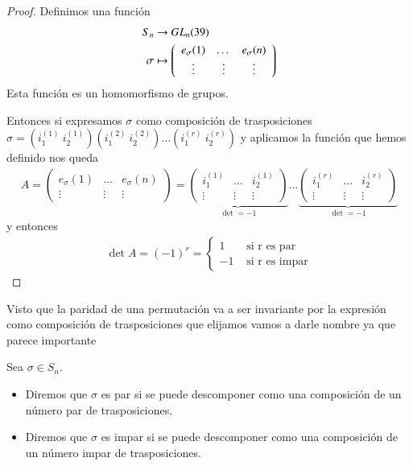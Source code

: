 \begin{proof}
	Definimos una función
	\begin{align*}
		S_n &\to GL_n(39)\\
		\sigma &\mapsto \left(\begin{array}{ccc}
		e_\sigma(1) & \dots & e_\sigma(n) \\
		\vdots & \vdots & \vdots
		\end{array}\right)
	\end{align*}
	Esta función es un homomorfismo de grupos.
	
	Entonces si expresamos $\sigma$ como composición de trasposiciones $\sigma = (i_1^{(1)}\ i_2^{(1)})(i_1^{(2)}\ i_2^{(2)}) \dots (i_1^{(r)}\ i_2^{(r)})$ y aplicamos la función que hemos definido nos queda
	\begin{align*}
		A = \left(\begin{array}{ccc}
		e_\sigma(1) & \dots & e_\sigma(n) \\
		\vdots & \vdots & \vdots
		\end{array}\right) = \underbrace{\left(\begin{array}{ccc}
			i_1^{(1)} & \dots & i_2^{(1)} \\
			\vdots & \vdots & \vdots
			\end{array}\right)}_{\det = -1} \dots \underbrace{\left(\begin{array}{ccc}
			i_1^{(r)} & \dots & i_2^{(r)} \\
			\vdots & \vdots & \vdots
			\end{array}\right)}_{\det = -1}
	\end{align*}
	y entonces
	\begin{align*}
		\det A = (-1)^r = \begin{cases}
		1 &\text{ si r es par} \\
		-1 &\text{ si r es impar}
		\end{cases}
	\end{align*}
\end{proof}

Visto que la paridad de una permutación va a ser invariante por la expresión como composición de trasposiciones que elijamos vamos a darle nombre ya que parece importante

\begin{dfn}
	Sea $\sigma \in S_n$.
	\begin{itemize}
		\item Diremos que $\sigma$ es par si se puede descomponer como una composición de un número par de trasposiciones.
		
		\item Diremos que $\sigma$ es impar si se puede descomponer como una composición de un número impar de trasposiciones.
	\end{itemize}
\end{dfn}

